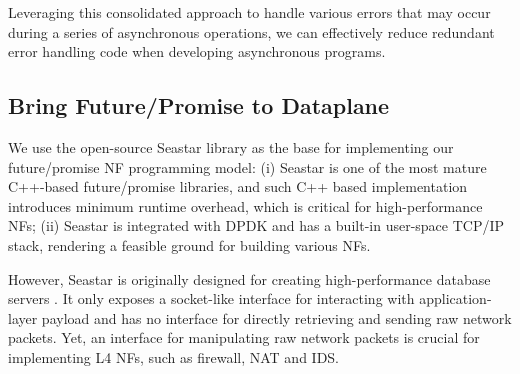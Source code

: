 Leveraging this consolidated approach to handle various errors that may occur during a series of asynchronous operations, we can effectively reduce redundant error handling code when developing asynchronous programs.





\subsection{Bring Future/Promise to Dataplane}


We use the open-source Seastar \cite{seastar} library as the base for implementing our future/promise NF programming model: (i) Seastar is one of the most mature C++-based future/promise libraries, and such C++ based implementation introduces minimum runtime overhead, which is critical for high-performance NFs; (ii) Seastar is integrated with DPDK and has a built-in user-space TCP/IP stack, rendering a feasible ground for building various NFs.

However, Seastar is originally designed for creating high-performance database servers \cite{scylladb}. %
 It only exposes a socket-like interface for interacting with application-layer payload and has no interface for directly retrieving and sending raw network packets. Yet, an interface for manipulating raw network packets is crucial for implementing L4 NFs, such as firewall, NAT and IDS.

